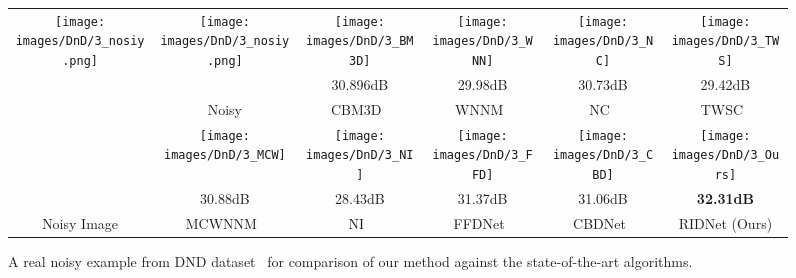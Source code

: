 \documentclass[10pt,twocolumn,letterpaper]{article}
\begin{document}
\begin{figure*}
\begin{center}
\begin{tabular}[b]{c@{ } c@{ }  c@{ } c@{ } c@{ } c@{ }	}
    \multirow{4}{*}{\texttt{[image: images/DnD/3\_nosiy.png]}} &  
    \texttt{[image: images/DnD/3\_nosiy.png]}&
  	\texttt{[image: images/DnD/3\_BM3D]}&   
    \texttt{[image: images/DnD/3\_WNN]}&
      	\texttt{[image: images/DnD/3\_NC]}&
	\texttt{[image: images/DnD/3\_TWS]}   
\\
    &       &30.896dB  & 29.98dB & 30.73dB & 29.42dB   \\
    & Noisy &CBM3D~\cite{Dabov2007BM3D}  & WNNM~\cite{Gu2014WNN}    & NC~\cite{lebrun2015NC}      & TWSC~\cite{xu2018TWSC} \\

    &
    \texttt{[image: images/DnD/3\_MCW]}&
    \texttt{[image: images/DnD/3\_NI]}&
    \texttt{[image: images/DnD/3\_FFD]}&  
    \texttt{[image: images/DnD/3\_CBD]}&   

     \texttt{[image: images/DnD/3\_Ours]}\\

     & 30.88dB & 28.43dB & 31.37dB & 31.06dB & \textbf{32.31dB}  \\
           Noisy Image  & MCWNNM~\cite{xu2017MCW}    & NI~\cite{NeatI}     &FFDNet~\cite{zhang2018ffdnet}       & CBDNet~\cite{guo2018CBDnet}     & RIDNet (Ours) \\
    
\end{tabular}
\end{center}
\vspace*{-4mm}
\caption{A real noisy example from DND dataset~\cite{plotz2017benchmarking} for comparison of our method against the state-of-the-art algorithms.}
\label{fig:DnD}
\vspace*{-5mm}
\end{figure*}
\end{document}
